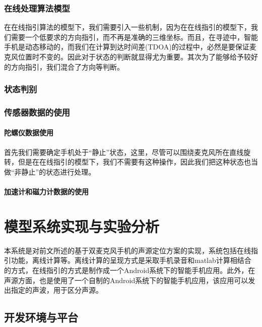 \documentclass[winfonts]{njuthesis}
\begin{document}
		\subsection{在线处理算法模型}
			
			在在线指引算法的模型下，我们需要引入一些机制，因为在在线指引的模型下，我们需要一个低要求的方向指引，而不再是准确的三维坐标。而且，在寻迹中，智能手机是动态移动的，而我们在计算到达时间差(TDOA)的过程中，必然是要保证麦克风位置时不变的。因此对于状态的判断就显得尤为重要。其次为了能够给予较好的方向指引，我们混合了方向等判断。
			
		\subsection{状态判别}
			
						
		\subsection{传感器数据的使用}	
				
			\subsubsection{陀螺仪数据使用}	
				
			首先我们需要确定手机处于“静止”状态，这里，尽管可以围绕麦克风所在直线旋转，但是在在线指引的模型下，我们不需要有这种操作，因此我们把这种状态也当做“非静止”的状态进行处理。
			
			\subsubsection{加速计和磁力计数据的使用}
			
			
					
	
\chapter{模型系统实现与实验分析}
	
	本系统是对前文所述的基于双麦克风手机的声源定位方案的实现，系统包括在线指引功能，离线计算等。离线计算的呈现方式是采取手机录音和matlab计算相结合的方式，在线指引的方式是制作成一个Android系统下的智能手机应用。此外，在声源方面，也是使用了一个自制的Android系统下的智能手机应用，该应用可以发出指定的声波，用于区分声源。
	
	
	\section{开发环境与平台}
		
\end{document}
